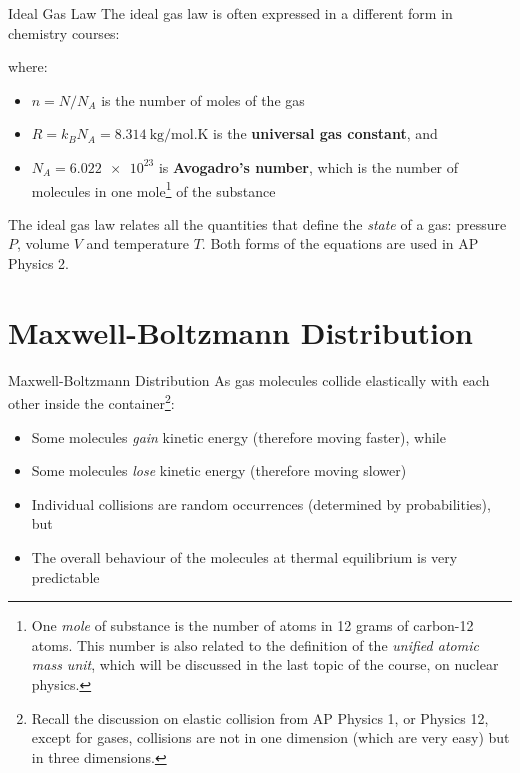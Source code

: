 \documentclass[12pt,aspectratio=169,dvipsnames]{beamer}
\begin{document}
\begin{frame}{Ideal Gas Law}
  The ideal gas law is often expressed in a different form in chemistry
  courses:  


  \vspace{-.15in}where:
  \begin{itemize}
  \item $n=N/N_A$ is the number of moles of the gas
  \item $R=k_BN_A=\SI{8.314}{\kilo\gram\per\mol.\kelvin}$ is the
    \textbf{universal gas constant}, and
  \item $N_A=\num{6.022e23}$ is \textbf{Avogadro's number}, which is the number
    of molecules in one mole\footnote{One \emph{mole} of substance is the
    number of atoms in 12 grams of carbon-12 atoms. This number is also
    related to the definition of the \emph{unified atomic mass unit}, which
    will be discussed in the last topic of the course, on nuclear physics.} of
    the substance
  \end{itemize}
  The ideal gas law
  relates all the quantities that define the \emph{state} of a gas: pressure
  $P$, volume $V$ and temperature $T$. Both forms of the equations are used in
  AP Physics 2.
  \vspace{.2in}
\end{frame}



\section{Maxwell-Boltzmann Distribution}

\begin{frame}{Maxwell-Boltzmann Distribution}
  As gas molecules collide elastically with each other inside the
  container\footnote{Recall the discussion on elastic collision from AP
  Physics 1, or Physics 12, except for gases, collisions are not in one
  dimension (which are very easy) but in three dimensions.}:
  \begin{itemize}
  \item Some molecules \emph{gain} kinetic energy (therefore moving faster),
    while
  \item Some molecules \emph{lose} kinetic energy (therefore moving slower)
  \item Individual collisions are random occurrences (determined by
    probabilities), but
  \item The overall behaviour of the molecules at thermal equilibrium is very
    predictable
  \end{itemize}
\end{frame}
\end{document}
